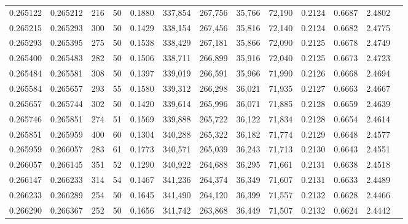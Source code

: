 \begin{tabular}{rrrrrrrrrrrrr}
0.265122 & 0.265212 &   216 &  50 &                                     0.1880 & 337,854 & 267,756 &  35,766 &  72,190 & 0.2124 & 0.6687 & 2.4802 \\
0.265215 & 0.265293 &   300 &  50 &                                     0.1429 & 338,154 & 267,456 &  35,816 &  72,140 & 0.2124 & 0.6682 & 2.4775 \\
0.265293 & 0.265395 &   275 &  50 &                                     0.1538 & 338,429 & 267,181 &  35,866 &  72,090 & 0.2125 & 0.6678 & 2.4749 \\
0.265400 & 0.265483 &   282 &  50 &                                     0.1506 & 338,711 & 266,899 &  35,916 &  72,040 & 0.2125 & 0.6673 & 2.4723 \\
0.265484 & 0.265581 &   308 &  50 &                                     0.1397 & 339,019 & 266,591 &  35,966 &  71,990 & 0.2126 & 0.6668 & 2.4694 \\
0.265584 & 0.265657 &   293 &  55 &                                     0.1580 & 339,312 & 266,298 &  36,021 &  71,935 & 0.2127 & 0.6663 & 2.4667 \\
0.265657 & 0.265744 &   302 &  50 &                                     0.1420 & 339,614 & 265,996 &  36,071 &  71,885 & 0.2128 & 0.6659 & 2.4639 \\
0.265746 & 0.265851 &   274 &  51 &                                     0.1569 & 339,888 & 265,722 &  36,122 &  71,834 & 0.2128 & 0.6654 & 2.4614 \\
0.265851 & 0.265959 &   400 &  60 &                                     0.1304 & 340,288 & 265,322 &  36,182 &  71,774 & 0.2129 & 0.6648 & 2.4577 \\
0.265959 & 0.266057 &   283 &  61 &                                     0.1773 & 340,571 & 265,039 &  36,243 &  71,713 & 0.2130 & 0.6643 & 2.4551 \\
0.266057 & 0.266145 &   351 &  52 &                                     0.1290 & 340,922 & 264,688 &  36,295 &  71,661 & 0.2131 & 0.6638 & 2.4518 \\
0.266147 & 0.266233 &   314 &  54 &                                     0.1467 & 341,236 & 264,374 &  36,349 &  71,607 & 0.2131 & 0.6633 & 2.4489 \\
0.266233 & 0.266289 &   254 &  50 &                                     0.1645 & 341,490 & 264,120 &  36,399 &  71,557 & 0.2132 & 0.6628 & 2.4466 \\
0.266290 & 0.266367 &   252 &  50 &                                     0.1656 & 341,742 & 263,868 &  36,449 &  71,507 & 0.2132 & 0.6624 & 2.4442 \\

\end{tabular}
